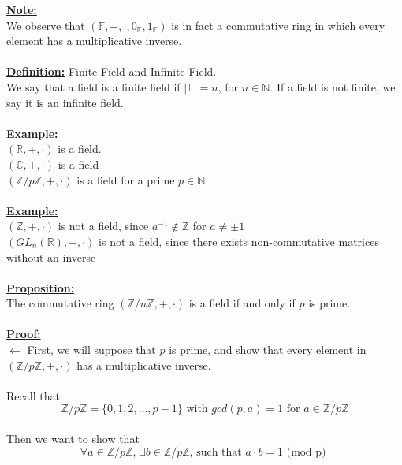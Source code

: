 \documentclass[11pt]{article}
\theoremstyle{plain}
\theoremstyle{definition}
\begin{document}
\textbf{\underline{Note:}}\\ 
We observe that  $( \mathbb{F} ,+,\cdot, 0_\mathbb{F} , 1_\mathbb{F} )$ is in fact a commutative ring in which every element has a multiplicative inverse.\\ 
\\
\textbf{\underline{Definition:}} Finite Field and Infinite Field. \\
We say that a field is a finite field if $| \mathbb{F} | = n$, for $n \in
\mathbb{N}$. If a field is not finite, we say it is an infinite field.\\
\\
\textbf{\underline{Example:}}\\ $(\mathbb{R}, +, \cdot)$ is a field.\\
$(\mathbb{C}, +, \cdot)$ is a field\\
$(\mathbb{Z}/p\mathbb{Z}, +, \cdot)$ is a field for a prime $p \in \mathbb{N}$\\
\\
\textbf{\underline{Example:}}\\ 
$( \mathbb{Z}, +, \cdot)$ is not a field, since $a^{-1} \notin \mathbb{Z}$ for $a \neq \pm 1$ \\	$( GL_{n} ( \mathbb{R} ), +, \cdot)$ is not a field, since there exists non-commutative matrices without an inverse\\	
\\
\textbf{\underline{Proposition:}}\\
 The commutative ring $(\mathbb{Z}/n\mathbb{Z}, +, \cdot)$ is a field if and only if $p$ is prime.\\
\\
\textbf{\underline{Proof:}}\\
$\leftarrow$ First, we will suppose that $p$ is prime, and show that every element in $(\mathbb{Z}/p\mathbb{Z}, +, \cdot)$ has a multiplicative inverse.\\
\\
Recall that:\\
\begin{equation*}
\mathbb{Z}/p\mathbb{Z} = \{0,1,2, \ldots, p-1 \} \text{ with }gcd(p, a) = 1 \text{ for }a \in \mathbb{Z}/p\mathbb{Z}
\end{equation*}
\\
Then we want to show that
\begin{equation*}
\forall a\in \mathbb{Z}/p\mathbb{Z} \text{, } \exists b \in \mathbb{Z}/p\mathbb{Z}\text{, such that } a \cdot b = 1 \text{ (mod p) }
\end{equation*}
\end{document}
